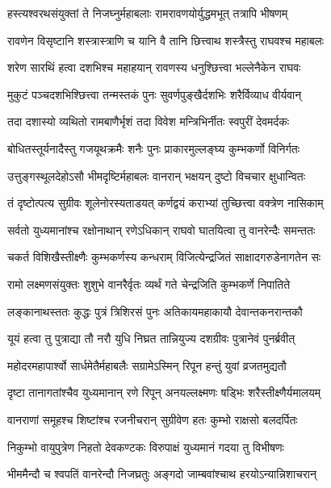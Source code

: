 \twolineshloka
{हस्त्यश्वरथसंयुक्तां ते निजघ्नुर्महाबलाः}
{रामरावणयोर्युद्धमभूत् तत्रापि भीषणम्} %

\twolineshloka
{रावणेन विसृष्टानि शस्त्रास्त्राणि च यानि वै}
{तानि छित्त्वाथ शस्त्रैस्तु राघवश्च महाबलः} %

\twolineshloka
{शरेण सारथिं हत्वा दशभिश्च महाहयान्}
{रावणस्य धनुश्छित्त्वा भल्लेनैकेन राघवः} %

\twolineshloka
{मुकुटं पञ्चदशभिश्छित्त्वा तन्मस्तकं पुनः}
{सुवर्णपुङ्खैर्दशभिः शरैर्विव्याध वीर्यवान्} %

\twolineshloka
{तदा दशास्यो व्यथितो रामबाणैर्भृशं तदा}
{विवेश मन्त्रिभिर्नीतः स्वपुरीं देवमर्दकः} %

\twolineshloka
{बोधितस्तूर्यनादैस्तु गजयूथक्रमैः शनैः}
{पुनः प्राकारमुल्लङ्घ्य कुम्भकर्णो विनिर्गतः} %

\twolineshloka
{उत्तुङ्गस्थूलदेहोऽसौ भीमदृष्टिर्महाबलः}
{वानरान् भक्षयन् दुष्टो विचचार क्षुधान्वितः} %

\twolineshloka
{तं दृष्टोत्पत्य सुग्रीवः शूलेनोरस्यताडयत्}
{कर्णद्वयं कराभ्यां तुच्छित्त्वा वक्त्रेण नासिकाम्} %

\twolineshloka
{सर्वतो युध्यमानांश्च रक्षोनाथान् रणेऽधिकान्}
{राघवो घातयित्वा तु वानरेन्दैः समन्ततः} %

\twolineshloka
{चकर्त विशिखैस्तीक्ष्णैः कुम्भकर्णस्य कन्धराम्}
{विजित्येन्द्रजितं साक्षादगरुडेनागतेन सः} %

\twolineshloka
{रामो लक्ष्मणसंयुक्तः शुशुभे वानरैर्वृतः}
{व्यर्थं गते चेन्द्रजिति कुम्भकर्णे निपातिते} %

\twolineshloka
{लङ्कानाथस्ततः कुद्धः पुत्रं त्रिशिरसं पुनः}
{अतिकायमहाकायौ देवान्तकनरान्तकौ} %

\twolineshloka
{यूयं हत्वा तु पुत्राद्या तौ नरौ युधि निघ्रत}
{तान्नियुज्य दशग्रीवः पुत्रानेवं पुनर्ब्रवीत्} %

\twolineshloka
{महोदरमहापार्श्वो सार्धमेतैर्महाबलैः}
{सग्रामेऽस्मिन् रिपून हन्तुं युवां व्रजतमुद्यतौ} %

\twolineshloka
{दृष्टा तानागतांश्चैव युध्यमानान् रणे रिपून्}
{अनयल्लक्ष्मणः षड्भिः शरैस्तीक्ष्णैर्यमालयम्} %

\twolineshloka
{वानराणां समूहश्च शिष्टांश्च रजनीचरान्}
{सुग्रीवेण हतः कुम्भो राक्षसो बलदर्पितः} %

\twolineshloka
{निकुम्भो वायुपुत्रेण निहतो देवकण्टकः}
{विरुपाक्षं युध्यमानं गदया तु विभीषणः} %

\twolineshloka
{भीममैन्दौ च श्वपतिं वानरेन्दौ निजघ्रतुः}
{अङ्गदो जाम्बवांश्चाथ हरयोऽन्यान्निशाचरान्} %

